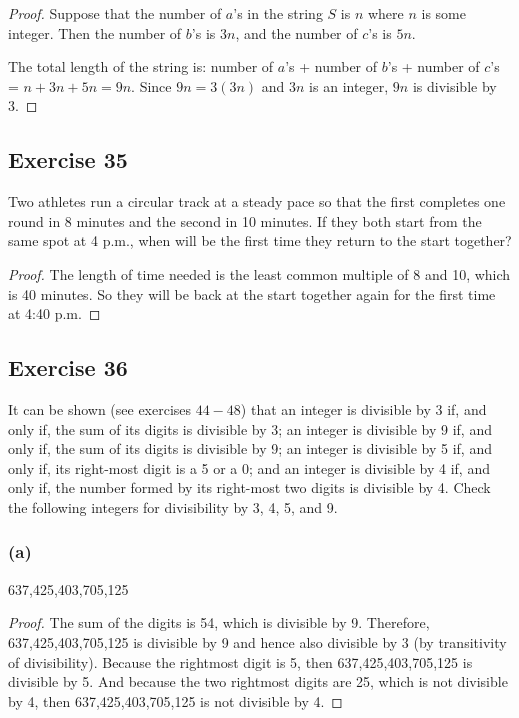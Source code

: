 \documentclass[14pt]{extarticle}
\begin{document}
\begin{proof}
Suppose that the number of $a$'s in the string $S$ is $n$ where $n$ is some integer. Then the number of $b$'s is $3n$, and the number of $c$'s is $5n$.

The total length of the string is: number of $a$'s + number of $b$'s + number of $c$'s = $n + 3n + 5n = 9n$. Since $9n = 3(3n)$ and $3n$ is an integer, $9n$ is divisible by 3.
\end{proof}

\subsection{Exercise 35}
Two athletes run a circular track at a steady pace so that the first completes one round in 8 minutes and the second in 10 minutes. If they both start from the same spot at 4 p.m., when will be the first time they return to the start
together?

\begin{proof}
The length of time needed is the least common multiple of 8 and 10, which is 40 minutes. So they will be back at the start together again for the first time at 4:40 p.m.
\end{proof}

\subsection{Exercise 36}
It can be shown (see exercises $44-48$) that an integer is divisible by 3 if, and only if, the sum of its digits is divisible by 3; an integer is divisible by 9 if, and only if, the sum of its digits is divisible by 9; an integer is divisible by 5 if, and only if, its right-most digit is a 5 or a 0; and an integer is divisible by 4 if, and only if, the number formed by its right-most two digits is divisible by 4. Check the following integers for divisibility by 3, 4, 5, and 9.

\subsubsection{(a)}
637,425,403,705,125

\begin{proof}
The sum of the digits is 54, which is divisible by 9. Therefore, 637,425,403,705,125 is divisible by 9 and hence also divisible by 3 (by transitivity of divisibility). Because the rightmost digit is 5, then 637,425,403,705,125 is divisible by 5. And because the two rightmost digits are 25, which is not divisible by 4, then 637,425,403,705,125 is not divisible by 4.
\end{proof}
\end{document}
